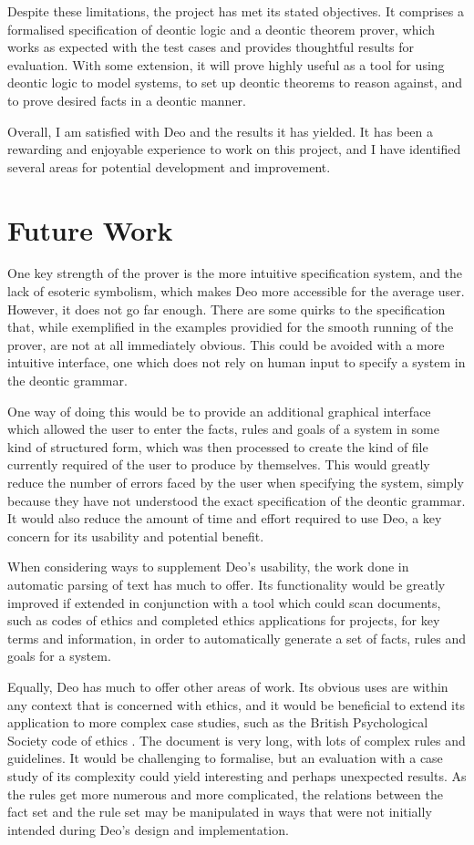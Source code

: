 \documentclass{l4proj}
\begin{document}
Despite these limitations, the project has met its stated objectives. It comprises a formalised specification of deontic logic and a deontic theorem prover, which works as expected with the test cases and provides thoughtful results for evaluation. With some extension, it will prove highly useful as a tool for using deontic logic to model systems, to set up deontic theorems to reason against, and to prove desired facts in a deontic manner. 

Overall, I am satisfied with Deo and the results it has yielded. It has been a rewarding and enjoyable experience to work on this project, and I have identified several areas for potential development and improvement. 

\section{Future Work}
One key strength of the prover is the more intuitive specification system, and the lack of esoteric symbolism, which makes Deo more accessible for the average user. However, it does not go far enough. There are some quirks to the specification that, while exemplified in the examples providied for the smooth running of the prover, are not at all immediately obvious. This could be avoided with a more intuitive interface, one which does not rely on human input to specify a system in the deontic grammar. 

One way of doing this would be to provide an additional graphical interface which allowed the user to enter the facts, rules and goals of a system in some kind of structured form, which was then processed to create the kind of file currently required of the user to produce by themselves. This would greatly reduce the number of errors faced by the user when specifying the system, simply because they have not understood the exact specification of the deontic grammar. It would also reduce the amount of time and effort required to use Deo, a key concern for its usability and potential benefit. 

When considering ways to supplement Deo's usability, the work done in automatic parsing of text has much to offer. Its functionality would be greatly improved if extended in conjunction with a tool which could scan documents, such as codes of ethics and completed ethics applications for projects, for key terms and information, in order to automatically generate a set of facts, rules and goals for a system.  

Equally, Deo has much to offer other areas of work. Its obvious uses are within any context that is concerned with ethics, and it would be beneficial to extend its application to more complex case studies, such as the British Psychological Society code of ethics \cite{bps_2016}. The document is very long, with lots of complex rules and guidelines. It would be challenging to formalise, but an evaluation with a case study of its complexity could yield interesting and perhaps unexpected results. As the rules get more numerous and more complicated, the relations between the fact set and the rule set may be manipulated in ways that were not initially intended during Deo's design and implementation. 
\end{document}
